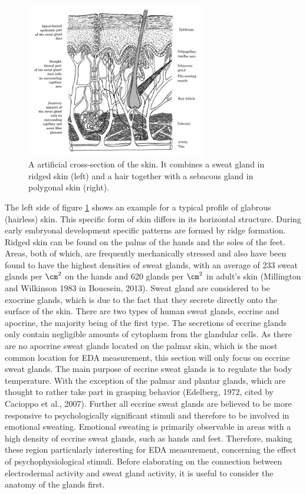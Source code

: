 \begin{figure}[ht]
\centering
\includegraphics[width=0.7\textwidth]{images/skinDermis.png}
\caption{A artificial cross-section of the skin. It combines a sweat gland in ridged skin (left) and a hair together with a sebacous gland in polygonal skin (right).\citep{boucsein2013electrodermal}}
\label{DermisImg}
\end{figure} 

The left side of figure \ref{DermisImg} shows an example for a typical profile of glabrous (hairless) skin. This specific form of skin differs in its horizontal structure. During early embryonal development specific patterns are formed by ridge formation. Ridged skin can be found on the palms of the hands and the soles of the feet. Areas, both of which, are frequently mechanically stressed and also have been found to have the highest densities of sweat glands, with an average of 233 sweat glands per $\cm^{2}$ on the hands and 620 glands per $\cm^{2}$ in adult's skin (Millington and Wilkinson 1983 in Boucsein, 2013). Sweat gland are considered to be exocrine glands, which is due to the fact that they secrete directly onto the surface of the skin. There are two types of human sweat glands, eccrine and apocrine, the majority being of the first type. The secretions of eccrine glands only contain negligible amounts of cytoplasm from the glandular cells. As there are no apocrine sweat glands located on the palmar skin, which is the most common location for EDA measurement, this section will only focus on eccrine sweat glands. The main purpose of eccrine sweat glands is to regulate the body temperature. With the exception of the palmar and plantar glands, which are thought to rather take part in grasping behavior (Edelberg, 1972, cited by Cacioppo et al., 2007). Further all eccrine sweat glands are believed to be more responsive to psychologically significant stimuli and therefore to be involved in emotional sweating. Emotional sweating is primarily observable in areas with a high density of eccrine sweat glands, such as hands and feet. Therefore, making these region particularly interesting for EDA measurement, concerning the effect of psychophysiological stimuli. Before elaborating on the connection between electrodermal activity and sweat gland activity, it is useful to consider the anatomy of the glands first.


